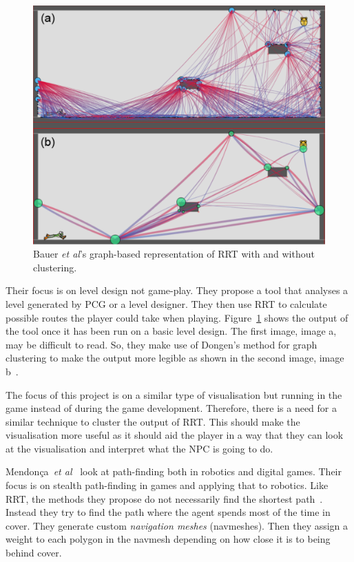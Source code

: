 \documentclass[journal]{IEEEtran}
\begin{document}
\begin{figure}[h]
	\includegraphics[width=1.0\linewidth]{BauerRRT.png}
	\caption{ Bauer \textit{et al}'s\cite{bauer2012} graph-based representation of RRT with and without clustering.}
	\label{BauerRRT}
\end{figure} 

Their focus is on level design not game-play. They propose a tool that analyses a level generated by PCG or a level designer. They then use RRT to calculate possible routes the player could take when playing.  Figure~\ref{BauerRRT} shows the output of the tool once it has been run on a basic level design.  The first image, image a, may be difficult to read. So, they make use of Dongen's method for graph clustering to make the output more legible as shown in the second image, image b~\cite{bauer2012,Dongen2001}.  

The focus of this project is on a similar type of visualisation but running in the game instead of during the game development. Therefore, there is a need for a similar technique to cluster the output of RRT. This should make the visualisation more useful as it should aid the player in a way that they can look at the visualisation and interpret what the NPC is going to do. 

Mendonça~\textit{et al}~\cite{Mendonça2015} look at path-finding both in robotics and digital games. Their focus is on stealth path-finding in games and applying that to robotics. Like RRT, the methods they propose do not necessarily find the shortest path~\cite{karaman2010,Mendonça2015}. Instead they try to find the path where the agent spends most of the time in cover. They generate custom \textit{navigation meshes} (navmeshes). Then they assign a weight to each polygon in the navmesh depending on how close it is to being behind cover. 
\end{document}
